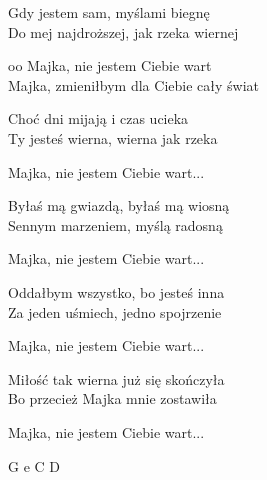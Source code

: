 \begin{text}
    Gdy jestem sam, myślami biegnę\\
    Do mej najdroższej, jak rzeka wiernej

    \vin oo Majka, nie jestem Ciebie wart\\
    \vin Majka, zmieniłbym dla Ciebie cały świat

    Choć dni mijają i czas ucieka\\
    Ty jesteś wierna, wierna jak rzeka

    \vin Majka, nie jestem Ciebie wart...

    Byłaś mą gwiazdą, byłaś mą wiosną\\
    Sennym marzeniem, myślą radosną

    \vin Majka, nie jestem Ciebie wart...

    Oddałbym wszystko, bo jesteś inna\\
    Za jeden uśmiech, jedno spojrzenie

    \vin Majka, nie jestem Ciebie wart...

    Miłość tak wierna już się skończyła\\
    Bo przecież Majka mnie zostawiła

    \vin Majka, nie jestem Ciebie wart...
\end{text}
\begin{chord}
    G e C D
\end{chord}
